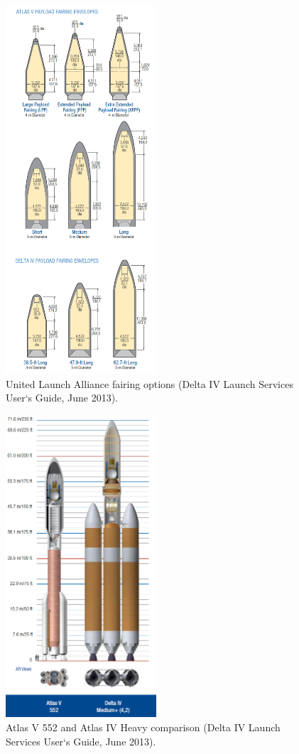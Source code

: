 \begin{figure}[htb]
\centering
\includegraphics[width=0.5\textwidth]{figures/Orbiter/fairings.png}
\caption{United Launch Alliance fairing options (Delta IV Launch Services User‘s Guide, June 2013).\cite{Atlasm}}
\end{figure}

\begin{figure}[htb]
\centering
\includegraphics[width=0.5\textwidth]{figures/Orbiter/launchv.png}
\caption{Atlas V 552 and Atlas IV Heavy comparison (Delta IV Launch Services User‘s Guide, June 2013).\cite{Atlasm}}
\end{figure}

